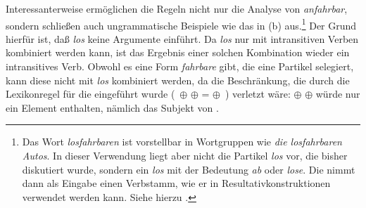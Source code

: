 Interessanterweise ermöglichen die Regeln nicht nur die Analyse von \emph{anfahrbar}, sondern
schließen auch ungrammatische Beispiele wie das in (b) aus.\footnote{
  Das Wort \emph{losfahrbaren} ist vorstellbar in Wortgruppen wie \emph{die losfahrbaren Autos}.
  In dieser Verwendung liegt aber nicht die Partikel \emph{los} vor, die bisher diskutiert
  wurde, sondern ein \emph{los} mit der Bedeutung \emph{ab} oder \emph{lose}. Die \bard
  nimmt dann als Eingabe einen Verbstamm, wie er in
  Resultativkonstruktionen verwendet werden 
  kann. Siehe hierzu .%
}
\eal
{}
\zl
Der Grund hierfür ist, daß \emph{los} keine Argumente einführt. Da \emph{los} nur mit intransitiven
Verben kombiniert werden kann, ist das Ergebnis einer solchen Kombination wieder ein intransitives Verb.
Obwohl es eine Form \emph{fahrbare} gibt, die eine Partikel selegiert, kann diese nicht mit \emph{los}
kombiniert werden, da die Beschränkung, die durch die Lexikonregel für die \bard eingeführt wurde
(\, $\oplus$  $\oplus$  =  $\oplus$ \,) 
verletzt wäre:  $\oplus$  $\oplus$  würde nur ein Element enthalten,
nämlich das Subjekt von .

